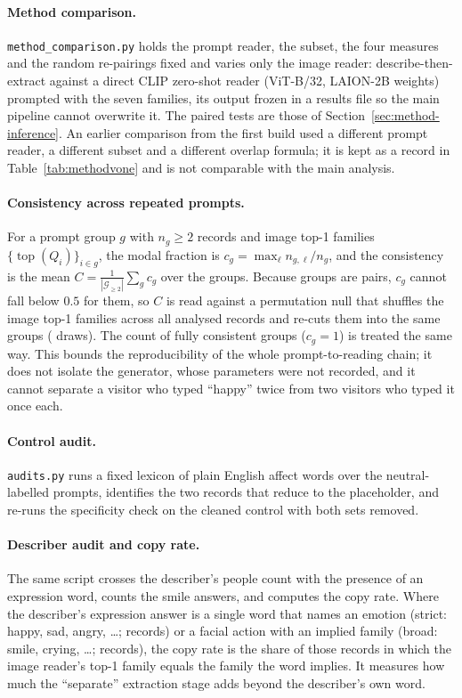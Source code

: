 \paragraph{Method comparison.} \texttt{method\_comparison.py} holds the prompt reader, the subset, the four measures and the random re-pairings fixed and varies only the image reader: describe-then-extract against a direct CLIP zero-shot reader \cite{radford2021learning, ilharco2021openclip} (ViT-B/32, LAION-2B weights) prompted with the seven families, its output frozen in a results file so the main pipeline cannot overwrite it. The paired tests are those of Section~\ref{sec:method-inference}. An earlier comparison from the first build used a different prompt reader, a different subset and a different overlap formula; it is kept as a record in Table~\ref{tab:methodvone} and is not comparable with the main analysis.

\paragraph{Consistency across repeated prompts.} For a prompt group $g$ with $n_g \ge 2$ records and image top-1 families $\{\operatorname{top}(Q_i)\}_{i \in g}$, the modal fraction is $c_g = \max_{\ell} n_{g,\ell} / n_g$, and the consistency is the mean $C = \frac{1}{|\mathcal{G}_{\ge 2}|} \sum_g c_g$ over the \nGroups{} groups. Because \nPairGroups{} groups are pairs, $c_g$ cannot fall below $0.5$ for them, so $C$ is read against a permutation null that shuffles the image top-1 families across all \nAnalysed{} analysed records and re-cuts them into the same groups (\ConsDraws{} draws). The count of fully consistent groups ($c_g = 1$) is treated the same way. This bounds the reproducibility of the whole prompt-to-reading chain; it does not isolate the generator, whose parameters were not recorded, and it cannot separate a visitor who typed ``happy'' twice from two visitors who typed it once each.

\paragraph{Control audit.} \texttt{audits.py} runs a fixed lexicon of \CtrlLexicon{} plain English affect words over the \CtrlN{} neutral-labelled prompts, identifies the two records that reduce to the placeholder, and re-runs the specificity check on the cleaned control with both sets removed.

\paragraph{Describer audit and copy rate.} The same script crosses the describer's people count with the presence of an expression word, counts the smile answers, and computes the copy rate. Where the describer's expression answer is a single word that names an emotion (strict: happy, sad, angry, \dots; \DescBareStrictN{} records) or a facial action with an implied family (broad: smile, crying, \dots; \DescBareBroadN{} records), the copy rate is the share of those records in which the image reader's top-1 family equals the family the word implies. It measures how much the ``separate'' extraction stage adds beyond the describer's own word.

